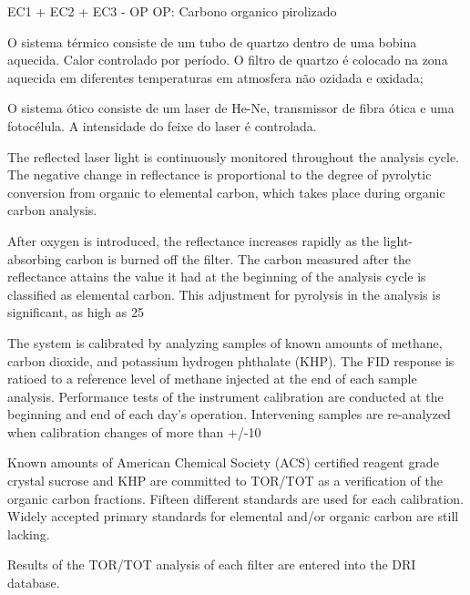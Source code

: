 EC1 + EC2 + EC3 - OP 
OP: Carbono organico pirolizado



O sistema térmico consiste de um tubo de quartzo dentro de uma bobina aquecida. Calor controlado 
por período. O filtro de quartzo é colocado na zona aquecida em diferentes temperaturas
em atmosfera não ozidada e oxidada; 

O sistema ótico consiste de um laser de He-Ne, transmissor de fibra ótica e uma fotocélula. 
A intensidade do feixe do laser é controlada. 



The reflected laser light is continuously monitored throughout the analysis cycle. The negative change in reflectance is proportional to the degree of pyrolytic conversion from organic to elemental carbon, which takes place during organic carbon analysis.

After oxygen is introduced, the reflectance increases rapidly as the light-absorbing carbon is burned off the filter. The carbon measured after the reflectance attains the value it had at the beginning of the analysis cycle is classified as elemental carbon. This adjustment for pyrolysis in the analysis is significant, as high as 25%

The system is calibrated by analyzing samples of known amounts of methane, carbon dioxide, and potassium hydrogen phthalate (KHP). The FID response is ratioed to a reference level of methane injected at the end of each sample analysis. Performance tests of the instrument calibration are conducted at the beginning and end of each day's operation. Intervening samples are re-analyzed when calibration changes of more than +/-10%

Known amounts of American Chemical Society (ACS) certified reagent grade crystal sucrose and KHP are committed to TOR/TOT as a verification of the organic carbon fractions. Fifteen different standards are used for each calibration. Widely accepted primary standards for elemental and/or organic carbon are still lacking.

Results of the TOR/TOT analysis of each filter are entered into the DRI database.
